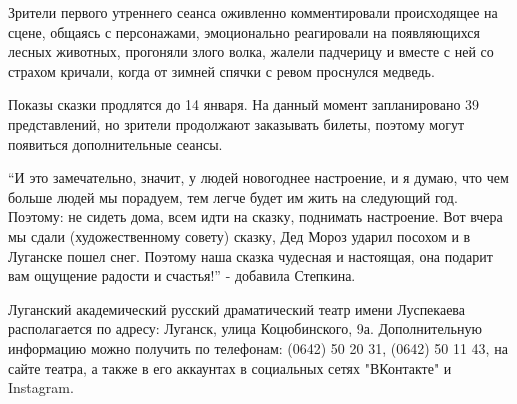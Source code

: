 
Зрители первого утреннего сеанса оживленно комментировали происходящее на
сцене, общаясь с персонажами, эмоционально реагировали на появляющихся лесных
животных, прогоняли злого волка, жалели падчерицу и вместе с ней со страхом
кричали, когда от зимней спячки с ревом проснулся медведь.

Показы сказки продлятся до 14 января. На данный момент запланировано 39
представлений, но зрители продолжают заказывать билеты, поэтому могут появиться
дополнительные сеансы.

\enquote{И это замечательно, значит, у людей новогоднее настроение, и я думаю, что чем
больше людей мы порадуем, тем легче будет им жить на следующий год. Поэтому: не
сидеть дома, всем идти на сказку, поднимать настроение. Вот вчера мы сдали
(художественному совету) сказку, Дед Мороз ударил посохом и в Луганске пошел
снег. Поэтому наша сказка чудесная и настоящая, она подарит вам ощущение
радости и счастья!} - добавила Степкина.

Луганский академический русский драматический театр имени Луспекаева
располагается по адресу: Луганск, улица Коцюбинского, 9а. Дополнительную
информацию можно получить по телефонам: (0642) 50 20 31, (0642) 50 11 43, на
сайте театра, а также в его аккаунтах в социальных сетях "ВКонтакте" и
Instagram. 
